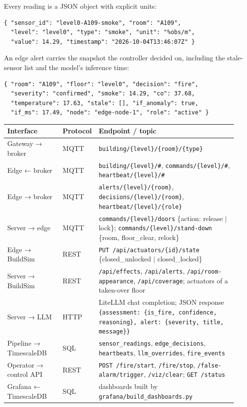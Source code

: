 \documentclass[11pt]{article}
\begin{document}
Every reading is a JSON object with explicit units:
\begin{lstlisting}
{ "sensor_id": "level0-A109-smoke", "room": "A109",
  "level": "level0", "type": "smoke", "unit": "%obs/m",
  "value": 14.29, "timestamp": "2026-10-04T13:46:07Z" }
\end{lstlisting}

An edge alert carries the snapshot the controller decided on, including the stale-sensor list and 
the model's inference time:
\begin{lstlisting}
{ "room": "A109", "floor": "level0", "decision": "fire",
  "severity": "confirmed", "smoke": 14.29, "co": 37.68,
  "temperature": 17.63, "stale": [], "if_anomaly": true,
  "if_ms": 17.49, "node": "edge-node-1", "role": "active" }
\end{lstlisting}

\begin{longtable}[]{@{}
  >{\raggedright\arraybackslash}p{0.24\linewidth}
  >{\raggedright\arraybackslash}p{0.10\linewidth}
  >{\raggedright\arraybackslash}p{0.60\linewidth}@{}}
\toprule
\textbf{Interface} & \textbf{Protocol} & \textbf{Endpoint / topic} \\
\midrule
\endhead
Gateway → broker & MQTT & \texttt{building/\{level\}/\{room\}/\{type\}} \\
Edge ← broker & MQTT & \texttt{building/\{level\}/\#}, \texttt{commands/\{level\}/\#}, \texttt{heartbeat/\{level\}/\#} \\
Edge → broker & MQTT & \texttt{alerts/\{level\}/\{room\}}, \texttt{decisions/\{level\}/\{room\}}, \texttt{heartbeat/\{level\}/\{role\}} \\
Server → edge & MQTT & \texttt{commands/\{level\}/doors} \{action: release $|$ lock\}; \texttt{commands/\{level\}/stand-down} \{room, floor\_clear, relock\} \\
Edge → BuildSim & REST & \texttt{PUT /api/actuators/\{id\}/state} \{closed\_unlocked $|$ closed\_locked\} \\
Server → BuildSim & REST & \texttt{/api/effects}, \texttt{/api/alerts}, \texttt{/api/room-appearance}, \texttt{/api/coverage}; actuators of a taken-over floor \\
Server → LLM & HTTP & LiteLLM chat completion; JSON response \texttt{\{assessment: \{is\_fire, confidence, reasoning\}, alert: \{severity, title, message\}\}} \\
Pipeline → TimescaleDB & SQL & \texttt{sensor\_readings}, \texttt{edge\_decisions}, \texttt{heartbeats}, \texttt{llm\_overrides}, \texttt{fire\_events} \\
Operator → control API & REST & \texttt{POST /fire/start}, \texttt{/fire/stop}, \texttt{/false-alarm/trigger}, \texttt{/viz/clear}; \texttt{GET /status} \\
Grafana ← TimescaleDB & SQL & dashboards built by \texttt{grafana/build\_dashboards.py} \\
\bottomrule
\end{longtable}
\end{document}
